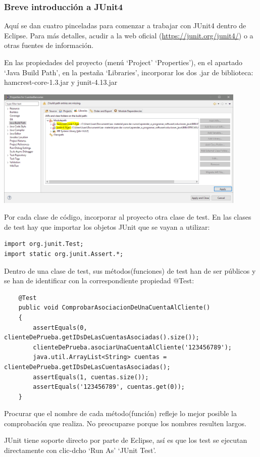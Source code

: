 \documentclass[spanish,12pt,a4paper,final,oneside]{book}
\begin{document}
\subsubsection{Breve introducción a JUnit4}
Aquí se dan cuatro pinceladas para comenzar a trabajar con JUnit4 dentro de Eclipse. Para más detalles, acudir a la web oficial (\url{https://junit.org/junit4/}) o a otras fuentes de información.

En las propiedades del proyecto (menú `Project' `Properties'), en el apartado `Java Build Path', en la pestaña `Libraries', incorporar los dos .jar de biblioteca: hamcrest-core-1.3.jar y junit-4.13.jar

\includegraphics[width=0.9\textwidth]{JUnit4 - poner bibliotecas en Java Build Path del proyecto}

Por cada clase de código, incorporar al proyecto otra clase de test. En las clases de test hay que importar los objetos JUnit que se vayan a utilizar: 
\begin{verbatim}
import org.junit.Test;
import static org.junit.Assert.*;
\end{verbatim}

Dentro de una clase de test, sus métodos(funciones) de test han de ser públicos y se han de identificar con la correspondiente propiedad @Test:
\begin{verbatim}
	@Test
	public void ComprobarAsociacionDeUnaCuentaAlCliente()
	{
		assertEquals(0, clienteDePrueba.getIDsDeLasCuentasAsociadas().size());
		clienteDePrueba.asociarUnaCuentaAlCliente('123456789');
		java.util.ArrayList<String> cuentas = clienteDePrueba.getIDsDeLasCuentasAsociadas();
		assertEquals(1, cuentas.size());
		assertEquals('123456789', cuentas.get(0));
	}
\end{verbatim}
Procurar que el nombre de cada método(función) refleje lo mejor posible la comprobación que realiza. No preocuparse porque los nombres resulten largos.

JUnit tiene soporte directo por parte de Eclipse, así es que los test se ejecutan directamente con clic-dcho `Run As' `JUnit Test'.
\end{document}

